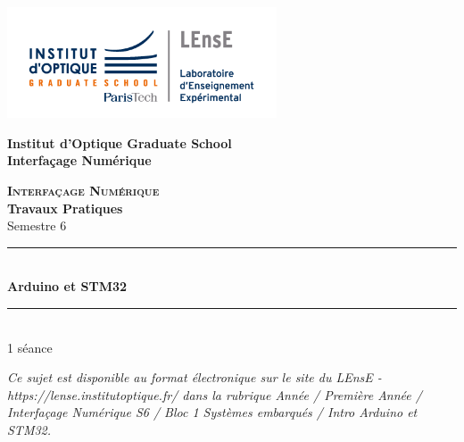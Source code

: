 \documentclass[a4paper,11pt,titlepage]{article} %
\begin{document}
\begin{titlepage}

\begin{center}
	\begin{minipage}{2.5cm}
	\begin{center}
		\includegraphics[width=8cm]{images/Logo-LEnsE.png}
	\end{center}
\end{minipage}\hfill
\begin{minipage}{10cm}
	\begin{center}
	\textbf{Institut d'Optique Graduate School }\\[0.1cm]
    \textbf{Interfaçage Numérique}


	\end{center}
\end{minipage}\hfill


\vspace{4cm}


{\huge \bfseries \textsc{Interfaçage Numérique}} \\[0.5cm]
{\large \bfseries Travaux Pratiques} \\[0.2cm]
Semestre 6

\vspace{2cm}
\rule{\linewidth}{0.3mm} \\[0.4cm]
{ \huge \bfseries\color{violet_iogs} Arduino et STM32 \\[0.4cm] }
\rule{\linewidth}{0.3mm} \\[1cm]

1 séance

\bigskip

\begin{center}
\end{center}

\vfill

\textit{Ce sujet est disponible au format électronique sur le site du LEnsE - https://lense.institutoptique.fr/ dans la rubrique Année / Première Année / Interfaçage Numérique S6 / Bloc 1 Systèmes embarqués / Intro Arduino et STM32.}


\end{center}
\end{titlepage}
\end{document}
